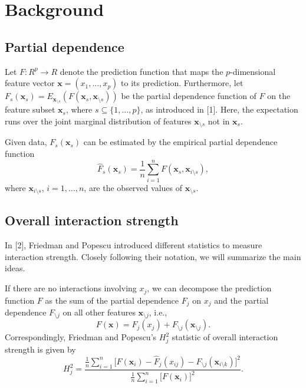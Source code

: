 \documentclass[]{article}
\title{}
\author{}
\begin{document}
\section{Background}
\subsection{Partial dependence}
Let $F: R^p \to R$ denote the prediction function that maps the $p$-dimensional feature vector $\mathbf{x} = (x_1, \dots, x_p)$ to its prediction.
Furthermore, let $F_s(\mathbf{x}_s) = E_{\mathbf{x}_{\setminus s}}(F(\mathbf{x}_s, \mathbf{x}_{\setminus s}))$ be the partial dependence function of $F$ on the feature subset $\mathbf{x}_s$, where $s \subseteq \{1, \dots, p\}$, as introduced in [1]. Here, the expectation runs over the joint marginal distribution of features $\mathbf{x}_{\setminus s}$ not in $\mathbf{x}_s$.

Given data, $F_s(\mathbf{x}_s)$ can be estimated by the empirical partial dependence function
$$
  \hat F_s(\mathbf{x}_s) = \frac{1}{n} \sum_{i = 1}^n F(\mathbf{x}_s, \mathbf{x}_{i\setminus s}),
$$
where $\mathbf{x}_{i\setminus s}$, $i = 1, \dots, n$, are the observed values of $\mathbf{x}_{\setminus s}$.

\subsection{Overall interaction strength}
In [2], Friedman and Popescu introduced different statistics to measure interaction strength. Closely following their notation, we will summarize the main ideas. 

If there are no interactions involving $x_j$, we can decompose the prediction function $F$ as the sum of the partial dependence $F_j$ on $x_j$ and the partial dependence $F_{\setminus j}$ on all other features $\mathbf{x}_{\setminus j}$, i.e.,
$$
	F(\mathbf{x}) = F_j(x_j) + F_{\setminus j}(\mathbf{x}_{\setminus j}).
$$
Correspondingly, Friedman and Popescu's $H^2_j$ statistic of overall interaction strength is given by
$$
	H_{j}^2 = \frac{\frac{1}{n} \sum_{i = 1}^n\big[F(\mathbf{x}_i) - \hat F_j(x_{ij}) - \hat F_{\setminus j}(\mathbf{x}_{i\setminus k})\big]^2}{\frac{1}{n} \sum_{i = 1}^n\big[F(\mathbf{x}_i)\big]^2}.
$$
\end{document}
